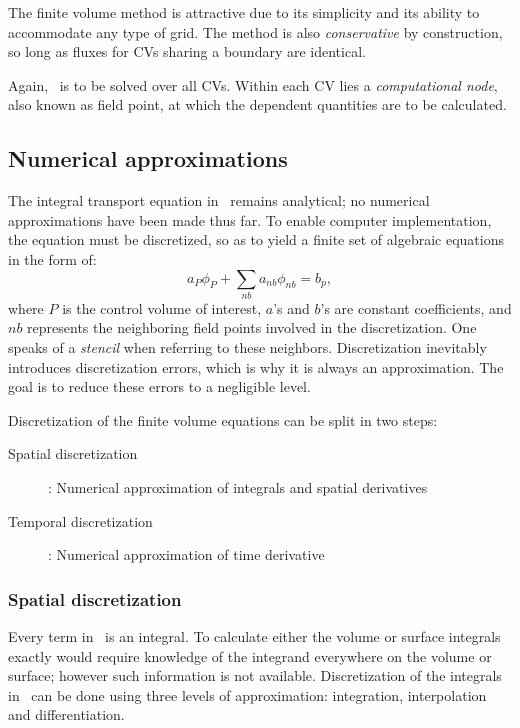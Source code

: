 The finite volume method is attractive due to its simplicity and its ability to accommodate any type of grid. The method is also \textit{conservative} by construction, so long as fluxes for CVs sharing a boundary are identical. 

Again,~ is to be solved over all CVs. Within each CV lies a \textit{computational node}, also known as field point, at which the dependent quantities are to be calculated. 
%
%
\subsection{Numerical approximations}
\label{sec:fvnum}
%
%
The integral transport equation in~ remains analytical; no numerical approximations have been made thus far. To enable computer implementation, the equation must be discretized, so as to yield a finite set of algebraic equations in the form of:
\begin{equation*}
    a_P \phi_P + \sum_{nb}a_{nb}\phi_{nb} = b_p,
\end{equation*}
where $P$ is the control volume of interest, $a$'s and $b$'s are constant coefficients, and $nb$ represents the neighboring field points involved in the discretization. One speaks of a \textit{stencil} when referring to these neighbors. Discretization inevitably introduces discretization errors, which is why it is always an approximation. The goal is to reduce these errors to a negligible level. 

Discretization of the finite volume equations can be split in two steps:
\begin{description}
    \item[Spatial discretization]: Numerical approximation of integrals and spatial derivatives
    \item[Temporal discretization]: Numerical approximation of time derivative
\end{description}

\subsubsection{Spatial discretization}
Every term in~ is an integral. To calculate either the volume or surface integrals exactly would require knowledge of the integrand everywhere on the volume or surface; however such information is not available. Discretization of the integrals in~ can be done using three levels of approximation: integration, interpolation and differentiation. 


